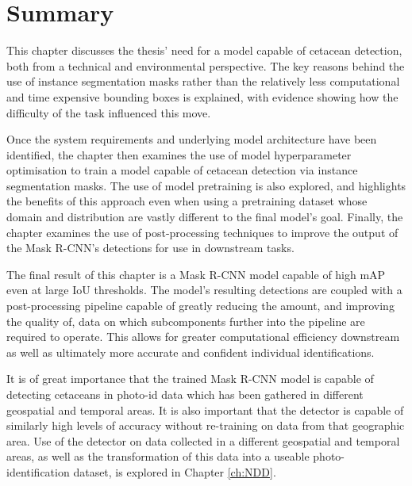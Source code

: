 \section{Summary}\label{ch:cetDet,sec:Summary}

This chapter discusses the thesis' need for a model capable of cetacean detection, both from a technical and environmental perspective. The key reasons behind the use of instance segmentation masks rather than the relatively less computational and time expensive bounding boxes is explained, with evidence showing how the difficulty of the task influenced this move. 

Once the system requirements and underlying model architecture have been identified, the chapter then examines the use of model hyperparameter optimisation to train a model capable of cetacean detection via instance segmentation masks. The use of model pretraining is also explored, and highlights the benefits of this approach even when using a pretraining dataset whose domain and distribution are vastly different to the final model's goal. Finally, the chapter examines the use of post-processing techniques to improve the output of the Mask R-CNN's detections for use in downstream tasks. 

The final result of this chapter is a Mask R-CNN model capable of high mAP even at large IoU thresholds. The model's resulting detections are coupled with a post-processing pipeline capable of greatly reducing the amount, and improving the quality of, data on which subcomponents further into the pipeline are required to operate. This allows for greater computational efficiency downstream as well as ultimately more accurate and confident individual identifications.

It is of great importance that the trained Mask R-CNN model is capable of detecting cetaceans in photo-id data which has been gathered in different geospatial and temporal areas. It is also important that the detector is capable of similarly high levels of accuracy without re-training on data from that geographic area. Use of the detector on data collected in a different geospatial and temporal areas, as well as the transformation of this data into a useable photo-identification dataset, is explored in Chapter \ref{ch:NDD}.


